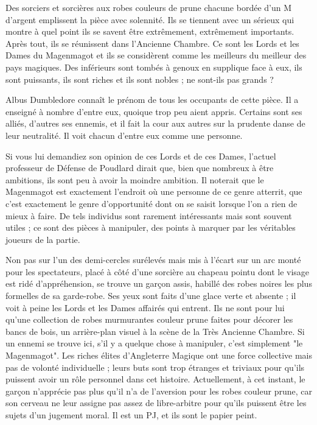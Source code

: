 Des sorciers et sorcières aux robes couleurs de prune chacune bordée d'un M d'argent emplissent la pièce avec solennité. Ils se tiennent avec un sérieux qui montre à quel point ils se savent être extrêmement, extrêmement importants. Après tout, ils se réunissent dans l'Ancienne Chambre. Ce sont les Lords et les Dames du Magenmagot et ils se considèrent comme les meilleurs du meilleur des pays magiques. Des inférieurs sont tombés à genoux en supplique face à eux, ils sont puissants, ils sont riches et ils sont nobles ; ne sont-ils pas grands ?

Albus Dumbledore connaît le prénom de tous les occupants de cette pièce. Il a enseigné à nombre d'entre eux, quoique trop peu aient appris. Certains sont ses alliés, d'autres ses ennemis, et il fait la cour aux autres sur la prudente danse de leur neutralité. Il voit chacun d'entre eux comme une personne.

Si vous lui demandiez son opinion de ces Lords et de ces Dames, l'actuel professeur de Défense de Poudlard dirait que, bien que nombreux à être ambitions, ils sont peu à avoir la moindre ambition. Il noterait que le Magenmagot est exactement l'endroit où une personne de ce genre atterrit, que c'est exactement le genre d'opportunité dont on se saisit lorsque l'on a rien de mieux à faire. De tels individus sont rarement intéressants mais sont souvent utiles ; ce sont des pièces à manipuler, des points à marquer par les véritables joueurs de la partie.

Non pas sur l'un des demi-cercles surélevés mais mis à l'écart sur un arc monté pour les spectateurs, placé à côté d'une sorcière au chapeau pointu dont le visage est ridé d'appréhension, se trouve un garçon assis, habillé des robes noires les plus formelles de sa garde-robe. Ses yeux sont faits d'une glace verte et absente ; il voit à peine les Lords et les Dames affairés qui entrent. Ils ne sont pour lui qu'une collection de robes murmurantes couleur prune faites pour décorer les bancs de bois, un arrière-plan visuel à la scène de la Très Ancienne Chambre. Si un ennemi se trouve ici, s'il y a quelque chose à manipuler, c'est simplement "le Magenmagot". Les riches élites d'Angleterre Magique ont une force collective mais pas de volonté individuelle ; leurs buts sont trop étranges et triviaux pour qu'ils puissent avoir un rôle personnel dans cet histoire. Actuellement, à cet instant, le garçon n'apprécie pas plus qu'il n'a de l'aversion pour les robes couleur prune, car son cerveau ne leur assigne pas assez de libre-arbitre pour qu'ils puissent être les sujets d'un jugement moral. Il est un PJ, et ils sont le papier peint.

